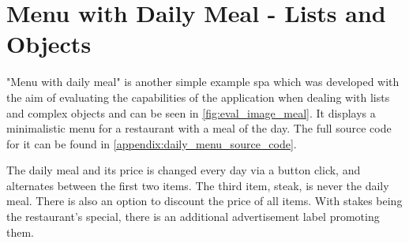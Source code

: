 \section{Menu with Daily Meal - Lists and Objects}
"Menu with daily meal" is another simple example \gls{spa} which was developed with the aim of evaluating the capabilities of the application when dealing with lists and complex objects and can be seen in \ref{fig:eval_image_meal}. It displays a minimalistic menu for a restaurant with a meal of the day. The full source code for it can be found in \ref{appendix:daily_menu_source_code}.

The daily meal and its price is changed every day via a button click, and alternates between the first two items. The third item, steak, is never the daily meal. There is also an option to discount the price of all items. With stakes being the restaurant's special, there is an additional advertisement label promoting them.
